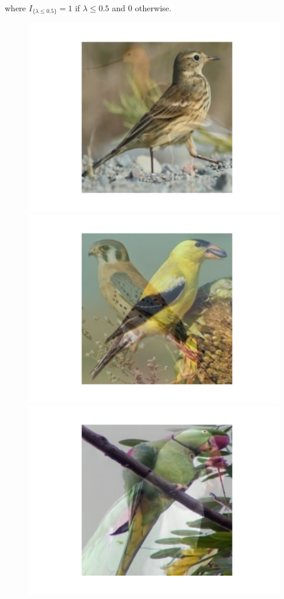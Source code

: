 \documentclass{article}
\begin{document}
where $I_{\{ \lambda \leq 0.5 \}} = 1$ if $\lambda \leq 0.5$ and $0$ otherwise.



\begin{figure}[!htb]
  \includegraphics[trim=3cm 2cm 3cm 3cm, width=\linewidth]{mixup1.pdf}
\endminipage\hfill
{}
  \includegraphics[trim=3cm 2cm 3cm 3cm, width=\linewidth]{mixup2.pdf}
\endminipage\hfill
{}%
  \includegraphics[trim=3cm 2cm 3cm 3cm, width=\linewidth]{mixup3.pdf}

\end{figure}
\end{document}
